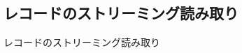 \documentclass[../../../main]{subfiles}
\begin{document}
    \subsection{レコードのストリーミング読み取り}\label{subsec:phraseology-record_streaming_read}

    レコードのストリーミング読み取り
\end{document}
